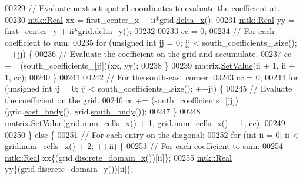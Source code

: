 \begin{DoxyCode}
00229       \textcolor{comment}{// Evaluate next set spatial coordinates to evaluate the coefficient at.}
00230       \hyperlink{group__c01-roots_gac080bbbf5cbb5502c9f00405f894857d}{mtk::Real} xx = first\_center\_x + ii*grid.\hyperlink{classmtk_1_1UniStgGrid2D_aca4710004c4a7da6a9e8fd6ab32a691f}{delta\_x}();
00231       \hyperlink{group__c01-roots_gac080bbbf5cbb5502c9f00405f894857d}{mtk::Real} yy = first\_center\_y + ii*grid.\hyperlink{classmtk_1_1UniStgGrid2D_a65a78cfc80ffdbeb282ed57af4dc5cb4}{delta\_y}();
00232 
00233       cc = 0;
00234       \textcolor{comment}{// For each coefficient to sum:}
00235       \textcolor{keywordflow}{for} (\textcolor{keywordtype}{unsigned} \textcolor{keywordtype}{int} jj = 0; jj < south\_coefficients\_.size(); ++jj) \{
00236         \textcolor{comment}{// Evaluate the coefficient on the grid and accumulate.}
00237         cc += (south\_coefficients\_[jj])(xx, yy);
00238       \}
00239       matrix.\hyperlink{classmtk_1_1DenseMatrix_a784ce5784109ac86bfb9d8562b334b13}{SetValue}(ii + 1, ii + 1, cc);
00240     \}
00241 
00242     \textcolor{comment}{// For the south-east corner:}
00243     cc = 0;
00244     \textcolor{keywordflow}{for} (\textcolor{keywordtype}{unsigned} \textcolor{keywordtype}{int} jj = 0; jj < south\_coefficients\_.size(); ++jj) \{
00245       \textcolor{comment}{// Evaluate the coefficient on the grid.}
00246       cc += (south\_coefficients\_[jj])(grid.\hyperlink{classmtk_1_1UniStgGrid2D_a03f689eb29a6369b82ce1207c655d5ff}{east\_bndy}(), grid.\hyperlink{classmtk_1_1UniStgGrid2D_a1442eaf219f099d0ebf46a170fdebf92}{south\_bndy}());
00247     \}
00248     matrix.\hyperlink{classmtk_1_1DenseMatrix_a784ce5784109ac86bfb9d8562b334b13}{SetValue}(grid.\hyperlink{classmtk_1_1UniStgGrid2D_a2d182866a398aba8e4829590e85bf939}{num\_cells\_x}() + 1, grid.\hyperlink{classmtk_1_1UniStgGrid2D_a2d182866a398aba8e4829590e85bf939}{num\_cells\_x}() + 1, cc);
00249 
00250   \} \textcolor{keywordflow}{else} \{
00251     \textcolor{comment}{// For each entry on the diagonal:}
00252     \textcolor{keywordflow}{for} (\textcolor{keywordtype}{int} ii = 0; ii < grid.\hyperlink{classmtk_1_1UniStgGrid2D_a2d182866a398aba8e4829590e85bf939}{num\_cells\_x}() + 2; ++ii) \{
00253       \textcolor{comment}{// For each coefficient to sum:}
00254       \hyperlink{group__c01-roots_gac080bbbf5cbb5502c9f00405f894857d}{mtk::Real} xx\{(grid.\hyperlink{classmtk_1_1UniStgGrid2D_ab2f70cf5cd0a2d5486992d9f2f8baa4a}{discrete\_domain\_x}())[ii]\};
00255       \hyperlink{group__c01-roots_gac080bbbf5cbb5502c9f00405f894857d}{mtk::Real} yy\{(grid.\hyperlink{classmtk_1_1UniStgGrid2D_ac33a58d65105550dcf6f6b92b48b5105}{discrete\_domain\_y}())[ii]\};

\end{DoxyCode}
